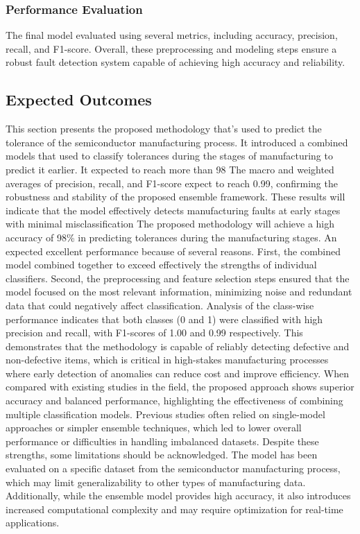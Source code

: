 \documentclass[12pt,oneside]{article}
\begin{document}
\subsubsection{Performance Evaluation}
The final model evaluated using several metrics, including accuracy, precision, recall, and F1-score. Overall, these preprocessing and modeling steps ensure a robust fault detection system capable of achieving high accuracy and reliability.

\subsection{Expected Outcomes}
This section presents the proposed methodology that's used to predict the tolerance of the semiconductor manufacturing process. It introduced a combined models that used to classify tolerances during the stages of manufacturing to predict it earlier. It expected to reach more than 98%
The macro and weighted averages of precision, recall, and F1-score expect to reach 0.99, confirming the robustness and stability of the proposed ensemble framework. These results will indicate that the model effectively detects manufacturing faults at early stages with minimal misclassification
The proposed methodology will achieve a high accuracy of 98\% in predicting tolerances during the manufacturing stages. An expected excellent performance because of several reasons. First, the combined model combined together to exceed effectively the strengths of individual classifiers. Second, the preprocessing and feature selection steps ensured that the model focused on the most relevant information, minimizing noise and redundant data that could negatively affect classification.
Analysis of the class-wise performance indicates that both classes (0 and 1) were classified with high precision and recall, with F1-scores of 1.00 and 0.99 respectively. This demonstrates that the methodology is capable of reliably detecting defective and non-defective items, which is critical in high-stakes manufacturing processes where early detection of anomalies can reduce cost and improve efficiency.
When compared with existing studies in the field, the proposed approach shows superior accuracy and balanced performance, highlighting the effectiveness of combining multiple classification models. Previous studies often relied on single-model approaches or simpler ensemble techniques, which led to lower overall performance or difficulties in handling imbalanced datasets.
Despite these strengths, some limitations should be acknowledged. The model has been evaluated on a specific dataset from the semiconductor manufacturing process, which may limit generalizability to other types of manufacturing data. Additionally, while the ensemble model provides high accuracy, it also introduces increased computational complexity and may require optimization for real-time applications.
\end{document}
